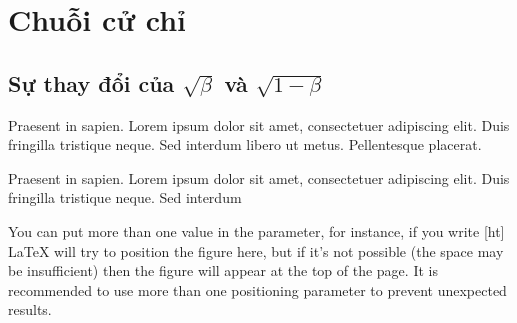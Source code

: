 \appendix

\chapter{Chuỗi cử chỉ}

\section{Sự thay đổi của $\sqrt{\beta}$ và $\sqrt{1-\beta}$}

Praesent in sapien. Lorem ipsum dolor sit amet, consectetuer 
adipiscing elit. Duis fringilla tristique neque. Sed interdum 
libero ut metus. Pellentesque placerat.



Praesent in sapien. Lorem ipsum dolor sit amet, consectetuer 
adipiscing elit. Duis fringilla tristique neque. Sed interdum



You can put more than one value in the parameter, for instance, if you write [ht] LaTeX will try to position the figure here, but if it's not possible (the space may be insufficient) then the figure will appear at the top of the page. It is recommended to use more than one positioning parameter to prevent unexpected results.
